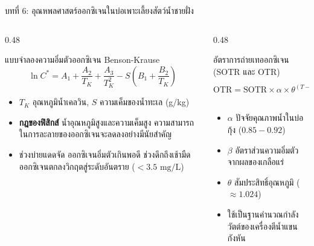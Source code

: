 \documentclass[aspectratio=169, 10pt]{beamer}
\begin{document}
\begin{frame}{บทที่ 6: อุณหพลศาสตร์ออกซิเจนในบ่อเพาะเลี้ยงสัตว์น้ำชายฝั่ง}
\begin{columns}[T]
    \begin{column}{0.48\textwidth}
        \begin{mastercard}{แบบจำลองความอิ่มตัวออกซิเจน Benson-Krause}
            \begin{equation*}
                \ln C^* = A_1 + \frac{A_2}{T_K} + \frac{A_3}{T_K^2} - S \left( B_1 + \frac{B_2}{T_K} \right)
            \end{equation*}
            \begin{itemize}
                \item $T_K$ อุณหภูมิน้ำเคลวิน, $S$ ความเค็มของน้ำทะเล (g/kg)
                \item \textbf{กฎของฟิสิกส์} น้ำอุณหภูมิสูงและความเค็มสูง ความสามารถในการละลายของออกซิเจนจะลดลงอย่างมีนัยสำคัญ
                \item ช่วงบ่ายแดดจัด ออกซิเจนอิ่มตัวเกินพอดี ช่วงดึกถึงเช้ามืด ออกซิเจนตกลงวิกฤตสู่ระดับอันตราย ($< 3.5\text{ mg/L}$)
            \end{itemize}
        \end{mastercard}
    \end{column}
    \begin{column}{0.48\textwidth}
        \begin{aquacard}{อัตราการถ่ายเทออกซิเจน (SOTR และ OTR)}
            \begin{equation*}
                \text{OTR} = \text{SOTR} \times \alpha \times \theta^{(T-20)} \times \left( \frac{\beta C^* - C_L}{C^*_{20}} \right)
            \end{equation*}
            \begin{itemize}
                \item $\alpha$ ปัจจัยคุณภาพน้ำในบ่อกุ้ง ($0.85 - 0.92$)
                \item $\beta$ อัตราส่วนความอิ่มตัวจากผลของเกลือแร่
                \item $\theta$ สัมประสิทธิ์อุณหภูมิ ($\approx 1.024$)
                \item ใช้เป็นฐานคำนวณกำลังวัตต์ของเครื่องตีน้ำแขนกังหัน
            \end{itemize}
        \end{aquacard}
    \end{column}
\end{columns}
\end{frame}
\end{document}
